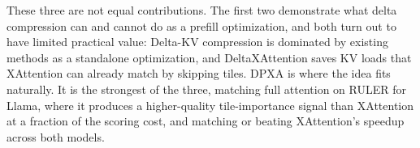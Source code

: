 These three are not equal contributions. The first two demonstrate what delta compression can and cannot do as a prefill optimization, and both turn out to have limited practical value: Delta-KV compression is dominated by existing methods as a standalone optimization, and DeltaXAttention saves KV loads that XAttention can already match by skipping tiles. DPXA is where the idea fits naturally. It is the strongest of the three, matching full attention on RULER for Llama, where it produces a higher-quality tile-importance signal than XAttention at a fraction of the scoring cost, and matching or beating XAttention's speedup across both models.

